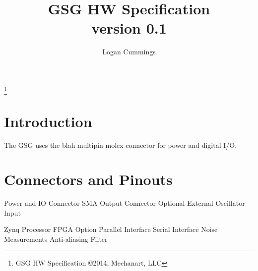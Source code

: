 \documentclass[letterpaper,12pt]{article}
\title{GSG HW Specification \\ \vspace{2 mm} {\large version 0.1}}
\author{Logan Cummings}
\begin{document}
\maketitle
\renewcommand*\footnoterule{}
\let\thefootnote\relax\footnote{GSG \hfill HW Specification  \hfill {\copyright{2014, Mechanart, LLC}}}
\newpage
\tableofcontents

\section{Introduction}

The GSG uses the blah multipin molex connector for power and digital I/O.

\section{Connectors and Pinouts}
Power and IO Connector
SMA Output Connector
Optional External Oscillator Input

Zynq Processor FPGA Option
Parallel Interface
Serial Interface 
Noise Measurements
Anti-aliasing Filter
\end{document}
